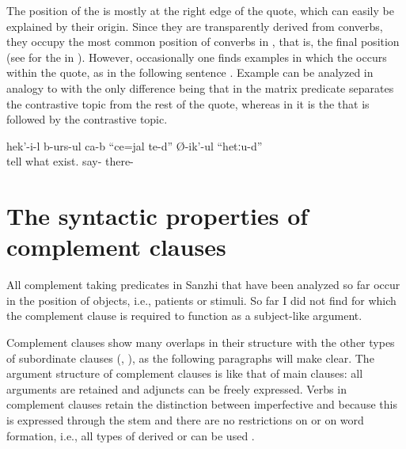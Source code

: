 The position of the   is mostly at the right edge of the quote, which can easily be explained by their origin. Since they are transparently derived from converbs, they occupy the most common position of converbs in , that is, the final position (see  for the  in ). However, occasionally one finds examples in which the   occurs within the quote, as in the following sentence . Example  can be analyzed in analogy to  with the only difference being that in  the matrix predicate separates the contrastive topic from the rest of the quote, whereas in  it is the   that is followed by the contrastive topic.
%
\begin{exe}
	\ex	\label{ex:He is telling that there is something there}
	\gll	hek'-i-l	b-urs-ul	ca-b	``ce=jal	te-d''	Ø-ik'-ul	``hetːu-d''\\
			tell		what	exist.		say-	there-\\
	\glt	{}
\end{exe}



\section{The syntactic properties of complement clauses}
\label{sec:The syntactic properties of complement clauses}

All complement taking predicates in Sanzhi that have been analyzed so far occur in the position of objects, i.e., patients or stimuli. So far I did not find  for which the complement clause is required to function as a subject-like argument.

Complement clauses show many overlaps in their structure with the other types of subordinate clauses (, ), as the following paragraphs will make clear.
The argument structure of complement clauses is like that of main clauses: all arguments are retained and adjuncts can be freely expressed. Verbs in complement clauses retain the distinction between imperfective and  because this is expressed through the stem and there are no restrictions on  or on word formation, i.e., all types of derived or  can be used .

